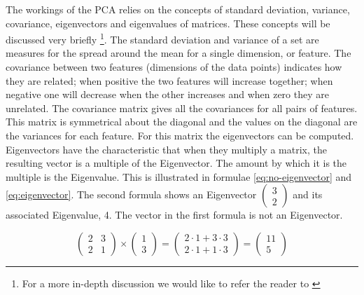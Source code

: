 The workings of the PCA \cite{smith2002tutorial} relies on the concepts of
standard deviation, variance,
covariance, eigenvectors and eigenvalues of matrices. These concepts will be
discussed very briefly \footnote{For a more in-depth discussion we would like
to refer the reader to \cite{jolliffe2005principal}}. The standard deviation
and variance
of a set are measures for the
spread around the mean for a single dimension, or feature. The covariance
between two features (dimensions of the data points) indicates how they are
related; when positive the two
features will increase together; when negative one will decrease when the
other increases and when zero they are unrelated. The covariance matrix gives
all the covariances for all pairs of features. This matrix is symmetrical
about the diagonal and the values on the diagonal are the variances for each
feature. For this matrix the eigenvectors can be computed. Eigenvectors have
the characteristic that when they multiply a matrix, the resulting vector is a
multiple of the Eigenvector. The amount by which it is the multiple is the
Eigenvalue. This is illustrated in formulae \ref{eq:no-eigenvector} and
\ref{eq:eigenvector}. The second formula shows an Eigenvector
$ \left( \begin{smallmatrix}
3 \\ 2 \end{smallmatrix} \right)$ and its
associated Eigenvalue, 4. The vector in the first formula is not an
Eigenvector.

\begin{equation} \label{eq:no-eigenvector}
	\begin{pmatrix} 2 & 3 \\ 2 & 1 \end{pmatrix}
\times
	\begin{pmatrix} 1 \\ 3 \end{pmatrix}
=
	\begin{pmatrix} 2 \cdot 1 + 3 \cdot 3 \\ 2 \cdot 1 + 1 \cdot 3
	\end{pmatrix}
=
	\begin{pmatrix} 11 \\ 5 \end{pmatrix}
\end{equation}

